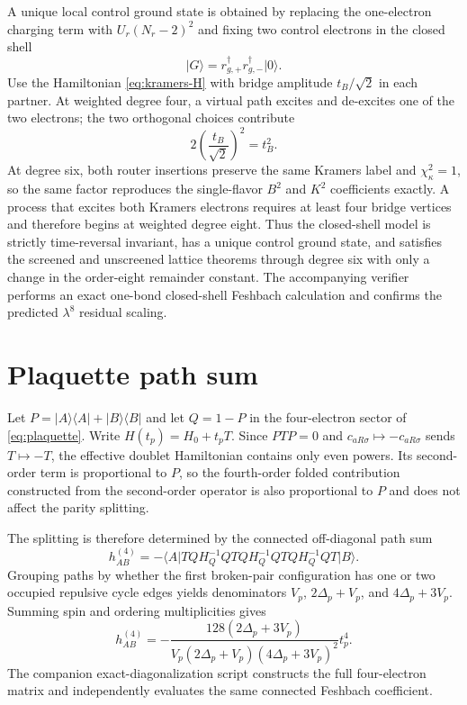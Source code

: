 \documentclass[11pt]{article}
\theoremstyle{definition}
\theoremstyle{remark}
\newcommand{\ket}[1]{\lvert #1\rangle}
\newcommand{\bra}[1]{\langle #1\rvert}
\begin{document}
A unique local control ground state is obtained by replacing the one-electron charging term with $U_r(N_r-2)^2$ and fixing two control electrons in the closed shell
\begin{equation}
 \ket G=r_{g,+}^\dagger r_{g,-}^\dagger\ket0.
\end{equation}
Use the Hamiltonian \eqref{eq:kramers-H} with bridge amplitude $t_B/\sqrt2$ in each partner.  At weighted degree four, a virtual path excites and de-excites one of the two electrons; the two orthogonal choices contribute
\begin{equation}
 2\left(\frac{t_B}{\sqrt2}\right)^2=t_B^2.
\end{equation}
At degree six, both router insertions preserve the same Kramers label and $\chi_\kappa^2=1$, so the same factor reproduces the single-flavor $B^2$ and $K^2$ coefficients exactly.  A process that excites both Kramers electrons requires at least four bridge vertices and therefore begins at weighted degree eight.  Thus the closed-shell model is strictly time-reversal invariant, has a unique control ground state, and satisfies the screened and unscreened lattice theorems through degree six with only a change in the order-eight remainder constant.  The accompanying verifier performs an exact one-bond closed-shell Feshbach calculation and confirms the predicted $\lambda^8$ residual scaling.

\section{Plaquette path sum}
\label{app:plaquette}

Let $P=\ket A\bra A+\ket B\bra B$ and let $Q=1-P$ in the four-electron sector of \eqref{eq:plaquette}.  Write $H(t_p)=H_0+t_pT$.  Since $PTP=0$ and $c_{aR\sigma}\mapsto-c_{aR\sigma}$ sends $T\mapsto-T$, the effective doublet Hamiltonian contains only even powers.  Its second-order term is proportional to $P$, so the fourth-order folded contribution constructed from the second-order operator is also proportional to $P$ and does not affect the parity splitting.

The splitting is therefore determined by the connected off-diagonal path sum
\begin{equation}
 h_{AB}^{(4)}=-\bra A TQH_Q^{-1}QTQH_Q^{-1}QTQH_Q^{-1}QT\ket B.
\end{equation}
Grouping paths by whether the first broken-pair configuration has one or two occupied repulsive cycle edges yields denominators $V_p$, $2\Delta_p+V_p$, and $4\Delta_p+3V_p$.  Summing spin and ordering multiplicities gives
\begin{equation}
 h_{AB}^{(4)}=-\frac{128(2\Delta_p+3V_p)}{V_p(2\Delta_p+V_p)(4\Delta_p+3V_p)^2}t_p^4.
\end{equation}
The companion exact-diagonalization script constructs the full four-electron matrix and independently evaluates the same connected Feshbach coefficient.
\end{document}
